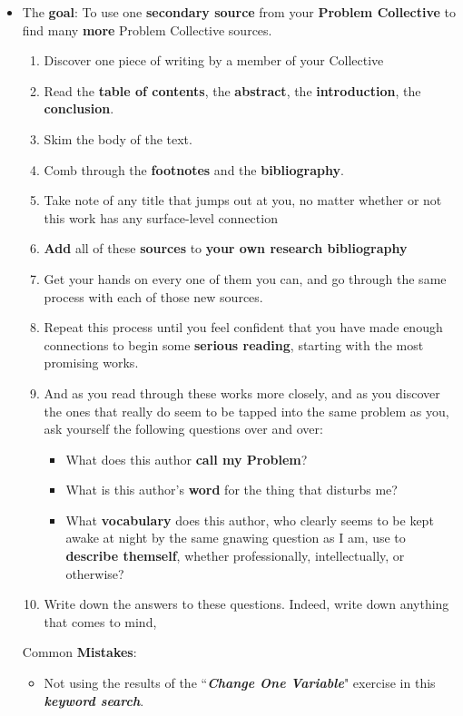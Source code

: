 \documentclass[11pt]{article}
\begin{document}
\begin{itemize}
\vspace{20pt}
\item  \begin{exercise}

The \textbf{goal}: To use one \textbf{secondary source} from your \textbf{Problem Collective} to find many \textbf{more} Problem Collective sources.

\begin{enumerate}
\item Discover one piece of writing by a member of your Collective
\item Read the \textbf{table of contents}, the \textbf{abstract}, the \textbf{introduction}, the \textbf{conclusion}. 
\item Skim the body of the text. 
\item Comb through the \textbf{footnotes} and the \textbf{bibliography}. 
\item Take note of any title that jumps out at you, no matter whether or not this work has any surface-level connection
\item \textbf{Add} all of these \textbf{sources} to \textbf{your own research bibliography}
\item Get your hands on every one of them you can, and go through the same process with each of those new sources. 
\item Repeat this process until you feel confident that you have made enough connections to begin some \textbf{serious reading}, starting with the most promising works.
\item And as you read through these works more closely, and as you discover the ones that really do seem to be tapped into the same problem as you, ask yourself the following questions over and over:
\begin{itemize}
\item What does this author \textbf{call my Problem}?
\item What is this author’s \textbf{word} for the thing that disturbs me?
\item What \textbf{vocabulary} does this author, who clearly seems to be kept awake at night by the same gnawing question as I am, use to \textbf{describe themself}, whether professionally, intellectually, or otherwise?
\end{itemize}
\item Write down the answers to these questions. Indeed, write down anything that comes to mind,
\end{enumerate}
\end{exercise}
Common \textbf{Mistakes}:
\begin{itemize}
\item Not using the results of the ``\emph{\textbf{Change One Variable}}" exercise in this \textbf{\emph{keyword search}}.


\end{itemize}
\end{itemize}
\end{document}
